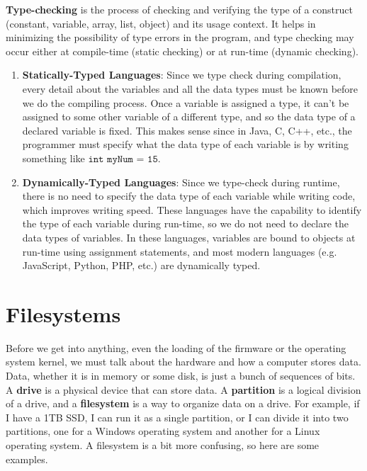 \documentclass{article}
\begin{document}
      \textbf{Type-checking} is the process of checking and verifying the type of a construct (constant, variable, array, list, object) and its usage context. It helps in minimizing the possibility of type errors in the program, and type checking may occur either at compile-time (static checking) or at run-time (dynamic checking). 
      \begin{enumerate}
        \item \textbf{Statically-Typed Languages}: Since we type check during compilation, every detail about the variables and all the data types must be known before we do the compiling process. Once a variable is assigned a type, it can't be assigned to some other variable of a different type, and so the data type of a declared variable is fixed. This makes sense since in Java, C, C++, etc., the programmer must specify what the data type of each variable is by writing something like $\texttt{int myNum = 15}$.

        \item \textbf{Dynamically-Typed Languages}: Since we type-check during runtime, there is no need to specify the data type of each variable while writing code, which improves writing speed. These languages have the capability to identify the type of each variable during run-time, so we do not need to declare the data types of variables. In these languages, variables are bound to objects at run-time using assignment statements, and most modern languages (e.g. JavaScript, Python, PHP, etc.) are dynamically typed.
      \end{enumerate}

\section{Filesystems}

  Before we get into anything, even the loading of the firmware or the operating system kernel, we must talk about the hardware and how a computer stores data. Data, whether it is in memory or some disk, is just a bunch of sequences of bits. A \textbf{drive} is a physical device that can store data. A \textbf{partition} is a logical division of a drive, and a \textbf{filesystem} is a way to organize data on a drive. For example, if I have a 1TB SSD, I can run it as a single partition, or I can divide it into two partitions, one for a Windows operating system and another for a Linux operating system. A filesystem is a bit more confusing, so here are some examples. 
\end{document}
